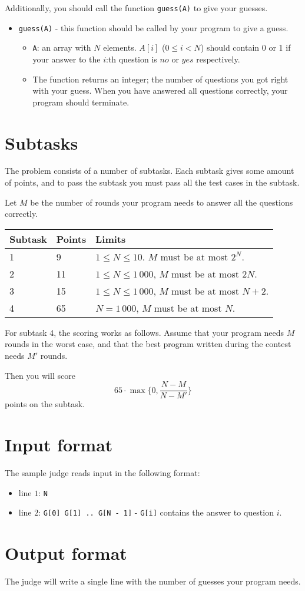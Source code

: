 Additionally, you should call the function \texttt{guess(A)} to give your guesses.
\begin{itemize}
  \item \texttt{guess(A)} - this function should be called by your program to give a guess.
    \begin{itemize}
      \item \texttt{A}: an array with $N$ elements. $A[i]$ ($0 \le i < N$) should contain 0 or 1 if your answer to the $i$:th question is $no$ or $yes$ respectively.
      \item The function returns an integer; the number of questions you got right with your guess. When you have answered all questions correctly, your program should terminate.
    \end{itemize}
\end{itemize}


\section*{Subtasks}
The problem consists of a number of subtasks. Each subtask gives some amount of points, and to pass
the subtask you must pass all the test cases in the subtask.

Let $M$ be the number of rounds your program needs to answer all the questions correctly.

\begin{tabular}{|l|l|l|}
  \hline
  \textbf{Subtask} & \textbf{Points} & \textbf{Limits} \\ \hline
  1 & 9 & $1 \le N \le 10$. $M$ must be at most $2^N$.  \\ \hline
  2 & 11 & $1 \le N \le 1\,000$, $M$ must be at most $2N$. \\ \hline
  3 & 15 & $1 \le N \le 1\,000$, $M$ must be at most $N + 2$. \\ \hline
  4 & 65 & $N = 1\,000$, $M$ must be at most $N$. \\ \hline
\end{tabular}

For subtask 4, the scoring works as follows. Assume that your program needs $M$ rounds in the worst case,
and that the best program written during the contest needs $M'$ rounds.

Then you will score
\[ 65 \cdot \max \{ 0, \frac{N - M}{N - M'} \} \]
points on the subtask.

\section*{Input format}
The sample judge reads input in the following format:

\begin{itemize}
  \item line $1$: \texttt{N}
  \item line $2$: \texttt{G[0] G[1] .. G[N - 1]} - \texttt{G[i]} contains the answer to question $i$.
\end{itemize}

\section*{Output format}
The judge will write a single line with the number of guesses your program needs.
